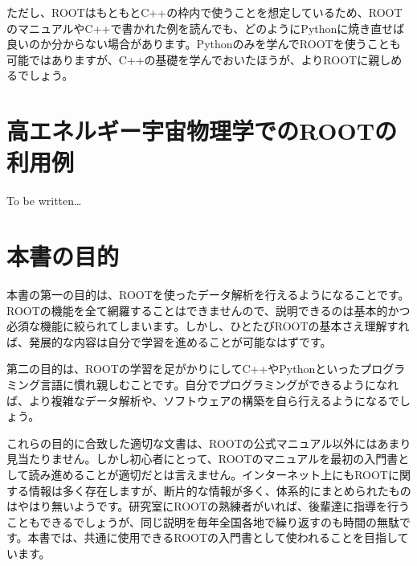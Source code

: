 ただし、ROOTはもともとC++の枠内で使うことを想定しているため、ROOTのマニュアルやC++で書かれた例を読んでも、どのようにPythonに焼き直せば良いのか分からない場合があります。Pythonのみを学んでROOTを使うことも可能ではありますが、C++の基礎を学んでおいたほうが、よりROOTに親しめるでしょう。

\section{高エネルギー宇宙物理学でのROOTの利用例}
To be written\ldots


\section{本書の目的}

本書の第一の目的は、ROOTを使ったデータ解析を行えるようになることです。ROOTの機能を全て網羅することはできませんので、説明できるのは基本的かつ必須な機能に絞られてしまいます。しかし、ひとたびROOTの基本さえ理解すれば、発展的な内容は自分で学習を進めることが可能なはずです。

第二の目的は、ROOTの学習を足がかりにしてC++やPythonといったプログラミング言語に慣れ親しむことです。自分でプログラミングができるようになれば、より複雑なデータ解析や、ソフトウェアの構築を自ら行えるようになるでしょう。

これらの目的に合致した適切な文書は、ROOTの公式マニュアル以外にはあまり見当たりません。しかし初心者にとって、ROOTのマニュアルを最初の入門書として読み進めることが適切だとは言えません。インターネット上にもROOTに関する情報は多く存在しますが、断片的な情報が多く、体系的にまとめられたものはやはり無いようです。研究室にROOTの熟練者がいれば、後輩達に指導を行うこともできるでしょうが、同じ説明を毎年全国各地で繰り返すのも時間の無駄です。本書では、共通に使用できるROOTの入門書として使われることを目指しています。

